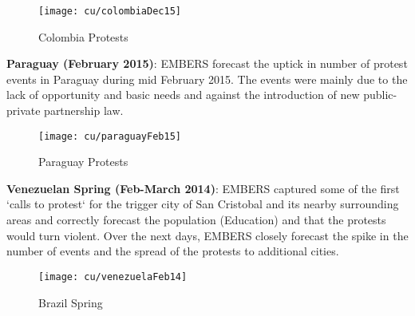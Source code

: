 \begin{figure}[H]
\texttt{[image: cu/colombiaDec15]}
\caption{Colombia Protests}
\label{fig:colombiaDec14}
\end{figure}

\textbf{Paraguay (February 2015)}:
EMBERS forecast the uptick in number of protest events in Paraguay during mid
February 2015. The events were mainly due to the lack of opportunity and basic
needs and against the introduction of new public-private partnership law.

\begin{figure}[H]
\texttt{[image: cu/paraguayFeb15]}
\caption{Paraguay Protests}
\label{fig:paraguay15}
\end{figure}

\textbf{Venezuelan Spring (Feb-March 2014)}:
EMBERS captured some of the first `calls to protest` for the trigger city of
San Cristobal and its nearby surrounding areas and correctly forecast the
population (Education) and that the protests would turn violent. Over the next
days, EMBERS closely forecast the spike in the number of events and the spread
of the protests to additional cities.

\begin{figure}[H]
\texttt{[image: cu/venezuelaFeb14]}
\caption{Brazil Spring}
\label{fig:brazilSpring}
\end{figure}

